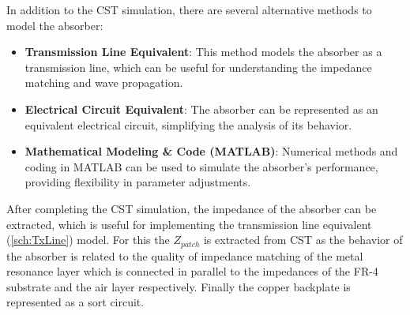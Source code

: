         In addition to the CST simulation, there are several alternative methods
        to model the absorber:
        \begin{itemize}
            \item \textbf{Transmission Line Equivalent}: This method models the 
                absorber as a transmission line, which can be useful for 
                understanding the impedance matching and wave propagation.
            \item \textbf{Electrical Circuit Equivalent}: The absorber can be 
                represented as an equivalent electrical circuit, simplifying the
                analysis of its behavior.
            \item \textbf{Mathematical Modeling \& Code (MATLAB)}: Numerical methods
                and coding in MATLAB can be used to simulate the absorber's 
                performance, providing flexibility in parameter adjustments.
        \end{itemize}
    
        After completing the CST simulation, the impedance of the absorber can be 
        extracted, which is useful for implementing the transmission line equivalent 
        (\ref{sch:TxLine}) model. For this the $Z_{patch}$ is extracted from CST as the 
        behavior of the absorber is related to the quality of impedance matching of the
        metal resonance layer which is connected in parallel to the impedances of the 
        FR-4 substrate and the air layer respectively. Finally the copper backplate is
        represented as a sort circuit.

